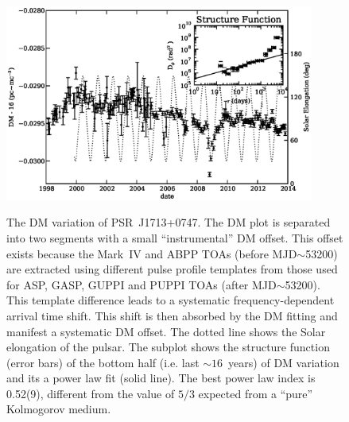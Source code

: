 \documentclass[12pt,preprint]{aastex}
\begin{document}
\begin{figure}
\includegraphics[width=4in]{DMX.ps} \\ 
\caption {\label{fig:dmx} The DM variation of PSR~J1713+0747. The DM plot is
separated into two segments with a small ``instrumental'' DM offset. This offset exists 
because the Mark~IV and ABPP TOAs (before MJD$\sim$53200) are extracted using
different pulse
profile templates from those used for ASP, GASP, GUPPI and PUPPI TOAs (after
MJD$\sim$53200). This template difference leads to a systematic
frequency-dependent arrival time shift. This shift is then absorbed by the DM
fitting and manifest a systematic DM offset. The dotted line shows the Solar
elongation of the pulsar. The subplot shows the structure
function (error bars) of the bottom half (i.e. last $\sim 16$~years) of DM
variation and its a power law fit (solid line). The best power law index is
0.52(9), different from the value of $5/3$ expected from a
``pure'' Kolmogorov medium. } 
\end{figure} 

\end{document}
